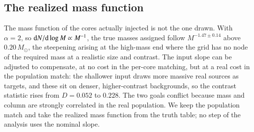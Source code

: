 \documentclass{aa}
\newcommand{\msun}{M_{\odot}}
\begin{document}
\subsection{The realized mass function}
The mass function of the cores actually
injected is not the one drawn. With $\alpha=2$, so
${\rm d}N/{\rm d}\log M \propto M^{-1}$, the true masses assigned follow
$M^{-1.47\pm0.14}$ above $0.20\,\msun$, the steepening arising at the
high-mass end where the grid has no node of the required mass at a realistic
size and contrast. The input slope can be adjusted to compensate, at no cost
in the per-core matching, but at a real cost in the population match: the
shallower input draws more massive real sources as targets, and these sit on
denser, higher-contrast backgrounds, so the contrast statistic rises from
$D=0.052$ to $0.228$. The two goals conflict because mass and column are
strongly correlated in the real population. We keep the population match and
take the realized mass function from the truth table; no step of the analysis
uses the nominal slope.
\end{document}
